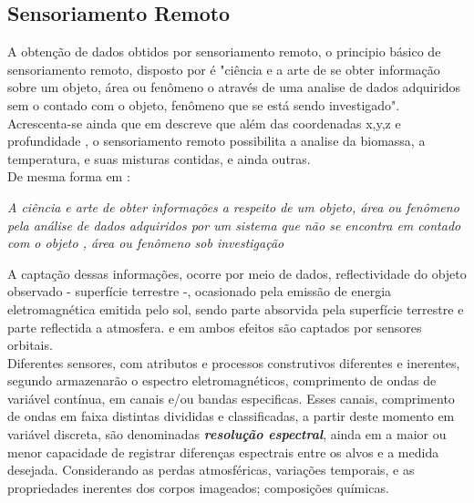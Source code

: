  \subsection*{Sensoriamento Remoto}

  \hspace*{1.25 cm} A obtenção de dados obtidos por sensoriamento remoto, o principio básico de sensoriamento remoto, disposto por \cite[p.~24]{Reddy} é "ciência e a arte de se obter informação sobre um objeto, área ou  fenômeno o através de uma analise de dados adquiridos sem o contado com o objeto, fenômeno que se está sendo investigado".  Acrescenta-se ainda que em \cite[p.~7]{Jensensens} descreve que além das coordenadas x,y,z e profundidade , o sensoriamento remoto possibilita a analise da biomassa, a temperatura, e suas misturas contidas, e ainda outras. \\
  \hspace*{1.25 cm} De mesma forma em \cite[p.1]{Lilesat} :
   \begin{quoting}[rightmargin=0cm,leftmargin=4cm]
 	\begin{singlespace}
 		{
 			\textit{A ciência e arte de obter informações a respeito de um objeto, área ou fenômeno pela análise de dados adquiridos por um sistema que não se encontra em contado com o objeto , área ou fenômeno sob investigação}
 		}
 	\end{singlespace}
 \end{quoting}
 \hspace*{1.25 cm} A captação dessas informações, ocorre por meio de dados, reflectividade do objeto observado - superfície terrestre -, ocasionado pela emissão de energia eletromagnética emitida pelo sol, sendo parte absorvida pela  superfície terrestre e parte reflectida a atmosfera. e em ambos efeitos são  captados  por sensores orbitais.\\
  \hspace*{1.25 cm} Diferentes sensores, com atributos e processos construtivos diferentes e  inerentes, segundo \cite[p.~20]{Centeno} armazenarão o espectro eletromagnéticos, comprimento de ondas de variável contínua, em canais e/ou bandas especificas. Esses canais, comprimento de ondas em faixa distintas divididas e  classificadas, a partir deste momento em variável discreta,  são denominadas \textbf{\textit{resolução espectral}}, ainda em \cite[p.~54]{Centeno} a maior ou menor capacidade de registrar diferenças espectrais entre os alvos e a medida desejada. Considerando as perdas atmosféricas, variações temporais, e as propriedades inerentes dos corpos imageados; composições químicas. \\
